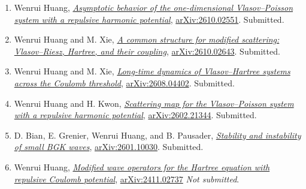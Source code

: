 \documentclass[11pt]{article}
\begin{document}
\begin{enumerate}
    \item Wenrui Huang,
    \href{https://arxiv.org/abs/2610.02551}
    {\emph{Asymptotic behavior of the one-dimensional Vlasov--Poisson system
    with a repulsive harmonic potential}},
    \href{https://arxiv.org/abs/2610.02551}{arXiv:2610.02551}.
    Submitted.
 
    \item Wenrui Huang and M. Xie,
    \href{https://arxiv.org/abs/2610.02643}
    {\emph{A common structure for modified scattering: Vlasov--Riesz, Hartree,
    and their coupling}},
    \href{https://arxiv.org/abs/2610.02643}{arXiv:2610.02643}.
    Submitted.
 
    \item Wenrui Huang and M. Xie,
    \href{https://arxiv.org/abs/2608.04402}
    {\emph{Long-time dynamics of Vlasov--Hartree systems across the Coulomb
    threshold}},
    \href{https://arxiv.org/abs/2608.04402}{arXiv:2608.04402}.
    Submitted.
 
    \item Wenrui Huang and H. Kwon,
    \href{https://arxiv.org/abs/2602.21344}
    {\emph{Scattering map for the Vlasov--Poisson system with a repulsive
    harmonic potential}},
    \href{https://arxiv.org/abs/2602.21344}{arXiv:2602.21344}.
    Submitted.
 
    \item  D. Bian, E. Grenier, Wenrui Huang, and B. Pausader,
    \href{https://arxiv.org/abs/2601.10030}
    {\emph{Stability and instability of small BGK waves}},
    \href{https://arxiv.org/abs/2601.10030}{arXiv:2601.10030}.
    Submitted.
 
    \item Wenrui Huang,
    \href{https://arxiv.org/abs/2411.02737}
    {\emph{Modified wave operators for the Hartree equation with repulsive
    Coulomb potential}},
    \href{https://arxiv.org/abs/2411.02737}{arXiv:2411.02737} \emph{Not submitted}.
\end{enumerate}
 
\end{document}
